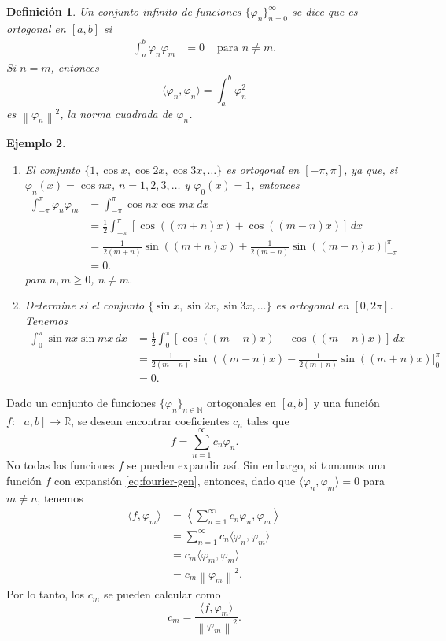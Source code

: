\documentclass[11pt,letterpaper]{report}
\newtheorem{defn}{Definición}[chapter]
\newtheorem{example}[defn]{Ejemplo}
\newcommand\R{\mathbb R}
\newcommand\N{\mathbb N}
\newcommand\norm[1]{\left\|#1\right\|}
\newcommand\<{\langle}
\renewcommand\>{\rangle}
\renewcommand\phi\varphi
\begin{document}
\begin{defn}
  Un conjunto infinito de funciones $\{\phi_n\}_{n=0}^\infty$ se
  dice que es ortogonal en $[a,b]$ si
  \begin{align*}
    \int_a^b\phi_n\phi_m &= 0 & \text{ para } n\neq m.
  \end{align*}
  Si $n=m$, entonces
  \[
    \<\phi_n,\phi_n\> = \int_a^b \phi_n^2
  \]
  es $\norm{\phi_n}^{2}$, la norma cuadrada de $\phi_n$.
\end{defn}

\begin{example}
  \begin{enumerate}
    \item   
    El conjunto $\{1,\cos x,\cos 2x,\cos 3x,\dots\}$ es ortogonal
    en $[-\pi,\pi]$, ya que, si $\phi_n(x)=\cos nx$,
    $n=1,2,3,\dots$ y $\phi_0(x)=1$, entonces
    \begin{align*}
      \int_{-\pi}^\pi \phi_n\phi_m
      &= \int_{-\pi}^\pi \cos nx \cos mx \,dx \\
      &= \frac{1}{2}
        \int_{-\pi}^\pi [\cos((m+n)x) + \cos((m-n)x)] \,dx \\
      &= \frac{1}{2(m+n)}\sin((m+n)x) + \frac{1}{2(m-n)}\sin((m-n)x)
      |_{-\pi}^\pi \\
      &= 0.
    \end{align*}
    para $n,m\geq 0$, $n\neq m$.

    \item Determine si el conjunto $\{\sin x,\sin 2x,\sin
    3x,\dots\}$ es ortogonal en $[0,2\pi]$.
    Tenemos
    \begin{align*}
      \int_0^\pi \sin nx\sin mx \,dx
      &= \frac{1}{2}\int_0^\pi[\cos((m-n)x)-\cos((m+n)x)] \,dx \\
      &= \frac{1}{2(m-n)}\sin((m-n)x)
        - \frac{1}{2(m+n)}\sin((m+n)x) |_0^\pi \\
      &= 0.
    \end{align*}
  \end{enumerate}
\end{example}

Dado un conjunto de funciones $\{\phi_n\}_{n\in\N}$ ortogonales en
$[a,b]$ y una función $f:[a,b]\to\R$,
se desean encontrar coeficientes $c_n$ tales que
\begin{equation}\label{eq:fourier-gen}
  f = \sum_{n=1}^{\infty}c_n\phi_n.
\end{equation}
No todas las funciones $f$ se pueden expandir así.
Sin embargo, si tomamos una función $f$ con expansión
\eqref{eq:fourier-gen}, entonces,
dado que $\<\phi_n,\phi_m\>=0$ para $m\neq n$, tenemos
\begin{align*}
  \<f,\phi_m\>
  &= \left\< \sum_{n=1}^{\infty}c_n\phi_n,\phi_m\right\> \\
  &= \sum_{n=1}^{\infty}c_n\<\phi_n,\phi_m\> \\
  &= c_m\<\phi_m,\phi_m\> \\
  &= c_m\norm{\phi_m}^{2}.
\end{align*}
Por lo tanto, los $c_m$ se pueden calcular como
\[
  c_m = \frac{\<f,\phi_m\>}{\norm{\phi_m}^2}
.\]
\end{document}
